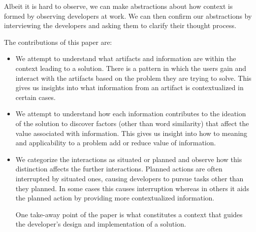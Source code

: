 Albeit it is hard to observe, we can make abstractions about how context is formed by observing developers at work. We can then confirm our abstractions by interviewing the developers and asking them to clarify their thought process.

The contributions of this paper are:
\begin{itemize}

\item We attempt to understand what artifacts and information are within the context leading to a solution. There is a pattern in which the users gain and interact with the artifacts based on the problem they are trying to solve. This gives us insights into what information from an artifact is contextualized in certain cases.

\item We attempt to understand how each information contributes to the  ideation of the solution to discover factors (other than word similarity) that affect the value associated with information. This gives us insight into how to meaning and applicability to a problem add or reduce value of information.

\item We categorize the interactions as situated or planned and observe how this distinction affects the further interactions. Planned actions are often interrupted by situated ones, causing developers to pursue tasks other than they planned. In some cases this causes interruption whereas in others it aids the planned action by providing more contextualized information. 

One take-away point of the paper is what constitutes a context that guides the developer's design and implementation of a solution.

\end{itemize}




